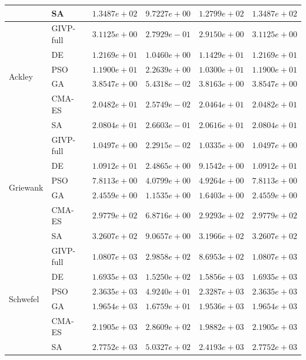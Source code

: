 \begin{table}[htb]
\begin{tabular}{llrrrr}
   & SA & $1.3487e+02$ & $9.7227e+00$ & $1.2799e+02$ & $1.3487e+02$ \\
\midrule
  \multirow{6}{*}{Ackley} & GIVP-full & $3.1125e+00$ & $2.7929e-01$ & $2.9150e+00$ & $3.1125e+00$ \\
   & DE & $1.2169e+01$ & $1.0460e+00$ & $1.1429e+01$ & $1.2169e+01$ \\
   & PSO & $1.1900e+01$ & $2.2639e+00$ & $1.0300e+01$ & $1.1900e+01$ \\
   & GA & $3.8547e+00$ & $5.4318e-02$ & $3.8163e+00$ & $3.8547e+00$ \\
   & CMA-ES & $2.0482e+01$ & $2.5749e-02$ & $2.0464e+01$ & $2.0482e+01$ \\
   & SA & $2.0804e+01$ & $2.6603e-01$ & $2.0616e+01$ & $2.0804e+01$ \\
\midrule
  \multirow{6}{*}{Griewank} & GIVP-full & $1.0497e+00$ & $2.2915e-02$ & $1.0335e+00$ & $1.0497e+00$ \\
   & DE & $1.0912e+01$ & $2.4865e+00$ & $9.1542e+00$ & $1.0912e+01$ \\
   & PSO & $7.8113e+00$ & $4.0799e+00$ & $4.9264e+00$ & $7.8113e+00$ \\
   & GA & $2.4559e+00$ & $1.1535e+00$ & $1.6403e+00$ & $2.4559e+00$ \\
   & CMA-ES & $2.9779e+02$ & $6.8716e+00$ & $2.9293e+02$ & $2.9779e+02$ \\
   & SA & $3.2607e+02$ & $9.0657e+00$ & $3.1966e+02$ & $3.2607e+02$ \\
\midrule
  \multirow{6}{*}{Schwefel} & GIVP-full & $1.0807e+03$ & $2.9858e+02$ & $8.6953e+02$ & $1.0807e+03$ \\
   & DE & $1.6935e+03$ & $1.5250e+02$ & $1.5856e+03$ & $1.6935e+03$ \\
   & PSO & $2.3635e+03$ & $4.9240e+01$ & $2.3287e+03$ & $2.3635e+03$ \\
   & GA & $1.9654e+03$ & $1.6759e+01$ & $1.9536e+03$ & $1.9654e+03$ \\
   & CMA-ES & $2.1905e+03$ & $2.8609e+02$ & $1.9882e+03$ & $2.1905e+03$ \\
   & SA & $2.7752e+03$ & $5.0327e+02$ & $2.4193e+03$ & $2.7752e+03$ \\
\bottomrule
\end{tabular}


\end{table}
